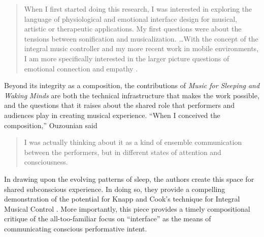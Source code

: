 \begin{quotation}
When I first started doing this research, I was interested in exploring the language of physiological and emotional interface design for musical, artistic or therapeutic applications. My first questions were about the tensions between sonification and musicalization. \ldots With the concept of the integral music controller and my more recent work in mobile environments, I am more specifically interested in the larger picture questions of emotional connection and empathy \cite{Ouzounian:2012}.
\end{quotation}

Beyond its integrity as a composition, the contributions of \textit{Music for Sleeping and Waking Minds}  are both the technical infrastructure that makes the work possible, and the questions that it raises about the shared role that performers and audiences play in creating musical experience.  ``When I conceived the composition,'' Ouzounian said 

\begin{quotation}
I was actually thinking about it as a kind of ensemble communication between the performers, but in different states of attention and consciousness. \cite{Ouzounian:2015} 
\end{quotation}

In drawing upon the evolving patterns of sleep, the authors create this space for shared subconscious experience.  In doing so, they provide a compelling demonstration of the potential for Knapp and Cook's technique for Integral Musical Control \cite{Knapp:2005}.  More importantly, this piece provides a timely compositional critique of the all-too-familiar focus on ``interface'' as the means of communicating conscious performative intent.  

